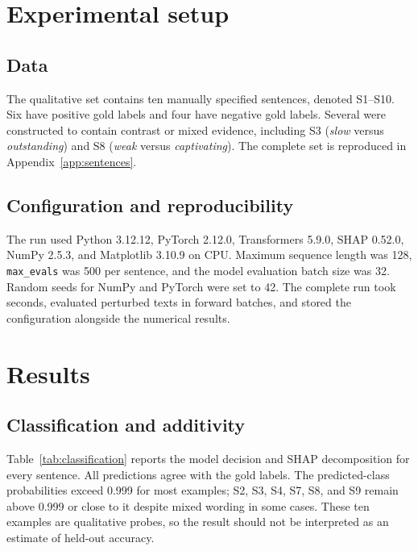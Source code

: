 \documentclass[11pt,a4paper]{article}
\begin{document}
\section{Experimental setup}

\subsection{Data}

The qualitative set contains ten manually specified sentences, denoted S1--S10.
Six have positive gold labels and four have negative gold labels. Several were
constructed to contain contrast or mixed evidence, including S3 (\emph{slow}
versus \emph{outstanding}) and S8 (\emph{weak} versus \emph{captivating}). The
complete set is reproduced in Appendix~\ref{app:sentences}.

\subsection{Configuration and reproducibility}

The run used Python 3.12.12, PyTorch 2.12.0, Transformers 5.9.0, SHAP 0.52.0,
NumPy 2.5.3, and Matplotlib 3.10.9 on CPU. Maximum sequence length was 128,
\texttt{max\_evals} was 500 per sentence, and the model evaluation batch size
was 32. Random seeds for NumPy and PyTorch were set to 42. The complete run took
\ResultRuntime{} seconds, evaluated \ResultModelEvaluations{} perturbed texts in
\ResultForwardBatches{} forward batches, and stored the configuration alongside
the numerical results.

\section{Results}

\subsection{Classification and additivity}

Table~\ref{tab:classification} reports the model decision and SHAP decomposition
for every sentence. All \ResultCorrectCount{} predictions agree with the gold
labels. The predicted-class probabilities exceed 0.999 for most examples; S2,
S3, S4, S7, S8, and S9 remain above 0.999 or close to it despite mixed wording in
some cases. These ten examples are qualitative probes, so the result should not
be interpreted as an estimate of held-out accuracy.
\end{document}
